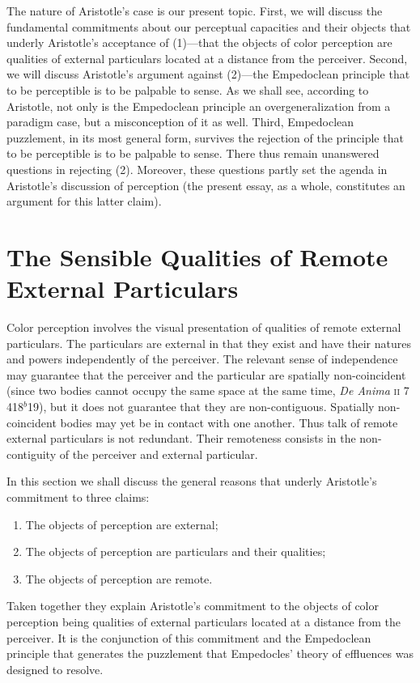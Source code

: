 The nature of Aristotle's case is our present topic. First, we will discuss the fundamental commitments about our perceptual capacities and their objects that underly Aristotle's acceptance of (1)---that the objects of color perception are qualities of external particulars located at a distance from the perceiver. Second, we will discuss Aristotle's argument against (2)---the Empedoclean principle that to be perceptible is to be palpable to sense. As we shall see, according to Aristotle, not only is the Empedoclean principle an overgeneralization from a paradigm case, but a misconception of it as well. Third, Empedoclean puzzlement, in its most general form, survives the rejection of the principle that to be perceptible is to be palpable to sense. There thus remain unanswered questions in rejecting (2). Moreover, these questions partly set the agenda in Aristotle's discussion of perception (the present essay, as a whole, constitutes an argument for this latter claim). 

\section{The Sensible Qualities of Remote External Particulars} %
\label{sec:sensible_qualities_of_remote_external_particulars}

Color perception involves the visual presentation of qualities of remote external particulars. The particulars are external in that they exist and have their natures and powers independently of the perceiver. The relevant sense of independence may guarantee that the perceiver and the particular are spatially non-coincident (since two bodies cannot occupy the same space at the same time, \emph{De Anima} \textsc{ii} 7 418\( ^{b} \)19), but it does not guarantee that they are non-contiguous. Spatially non-coincident bodies may yet be in contact with one another. Thus talk of remote external particulars is not redundant. Their remoteness consists in the non-contiguity of the perceiver and external particular.

In this section we shall discuss the general reasons that underly Aristotle's commitment to three claims:
\begin{enumerate}[(1)]
    \item The objects of perception are external;
    \item The objects of perception are particulars and their qualities;
    \item The objects of perception are remote.
\end{enumerate}
Taken together they explain Aristotle's commitment to the objects of color perception being qualities of external particulars located at a distance from the perceiver. It is the conjunction of this commitment and the Empedoclean principle that generates the puzzlement that Empedocles' theory of effluences was designed to resolve.


